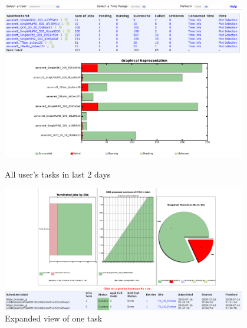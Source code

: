 \begin{figure}
\begin{minipage}{.45\textwidth}
\centering
 \includegraphics[width=0.95\textwidth]{figures/TaskMonitor1.png}
\caption{All user's tasks in last 2 days}
\label{fig:TaskMonitor1}
\end{minipage}
\begin{minipage}{.45\textwidth}
\centering
\includegraphics[width=0.95\textwidth]{figures/TaskMonitor2.png}
\caption{Expanded view of one task}
\label{fig:TaskMonitor2}
\end{minipage}
\end{figure}

